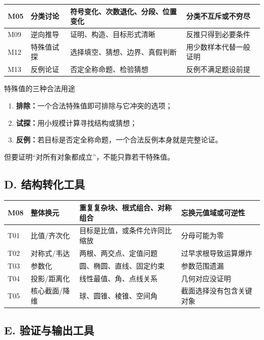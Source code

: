 \documentclass[11pt,a4paper]{ctexart}
\begin{document}
\begin{longtable}{p{2cm}p{3.3cm}p{5.3cm}p{4.8cm}}
\toprule
M05 & 分类讨论 & 符号变化、次数退化、分段、位置变化 & 分类不互斥或不穷尽\\ \hline
M09 & 逆向推导 & 证明、构造、目标形式清晰 & 反推只得到必要条件\\ \hline
M12 & 特殊值试探 & 选择填空、猜想、边界、真假判断 & 用少数样本代替一般证明\\ \hline
M13 & 反例论证 & 否定全称命题、检验猜想 & 反例不满足题设前提\\
\bottomrule
\end{longtable}

\begin{corebox}{特殊值的三种合法用途}
\begin{enumerate}
  \item \textbf{排除：}一个合法特殊值即可排除与它冲突的选项；
  \item \textbf{试探：}用小规模计算寻找结构或猜想；
  \item \textbf{反例：}若目标是否定全称命题，一个合法反例本身就是完整论证。
\end{enumerate}
但要证明“对所有对象都成立”，不能只靠若干特殊值。
\end{corebox}

\subsection{D. 结构转化工具}

\begin{longtable}{p{2cm}p{3.3cm}p{5.3cm}p{4.8cm}}
\toprule
M08 & 整体换元 & 重复复杂块、根式组合、对称组合 & 忘换元值域或可逆性\\ \hline
T01 & 比值/齐次化 & 目标是比值，或条件允许同比缩放 & 分母可能为零\\ \hline
T02 & 对称式/韦达 & 两根、两交点、定值问题 & 过早求根导致运算爆炸\\ \hline
T03 & 参数化 & 圆、椭圆、直线、固定约束 & 参数范围遗漏\\ \hline
T04 & 投影/距离化 & 线性最值、角、点线关系 & 几何对应没证明\\ \hline
T05 & 核心截面/降维 & 球、圆锥、棱锥、空间角 & 截面选择没有包含关键对象\\
\bottomrule
\end{longtable}

\subsection{E. 验证与输出工具}
\end{document}

